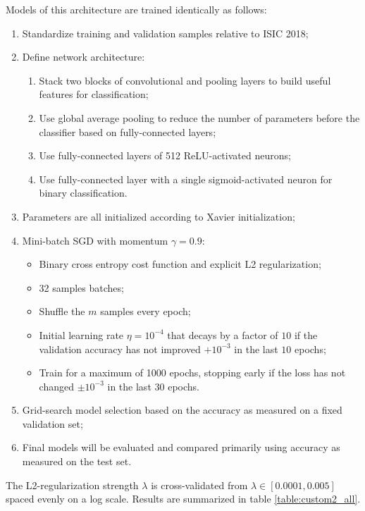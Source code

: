 Models of this architecture are trained identically as follows:

\begin{enumerate}
    \item Standardize training and validation samples relative to \ac{ISIC} 2018;
    \item Define network architecture:
        \begin{enumerate}
            \item Stack two blocks of convolutional and pooling layers to build useful features for classification;
            \item Use global average pooling to reduce the number of parameters before the classifier based on fully-connected layers;
            \item Use fully-connected layers of 512 ReLU-activated neurons;
            \item Use fully-connected layer with a single sigmoid-activated neuron for binary classification.
        \end{enumerate}
    \item Parameters are all initialized according to Xavier initialization;
    \item Mini-batch \ac{SGD} with momentum $\gamma = 0.9$:
        \begin{itemize}
            \item Binary cross entropy cost function and explicit L2 regularization;
            \item 32 samples batches;
            \item Shuffle the $m$ samples every epoch;
            \item Initial learning rate $\eta = 10^{-4}$ that decays by a factor of $10$ if the validation accuracy has not improved $+10^{-3}$ in the last $10$ epochs;
            \item Train for a maximum of 1000 epochs, stopping early if the loss has not changed $\pm 10^{-3}$ in the last $30$ epochs.
        \end{itemize}
    \item Grid-search model selection based on the accuracy as measured on a fixed validation set;
    \item Final models will be evaluated and compared primarily using accuracy as measured on the test set.
\end{enumerate}

The L2-regularization strength $\lambda$ is cross-validated from $\lambda \in [0.0001, 0.005]$ spaced evenly on a log scale. Results are summarized in table \ref{table:custom2_all}.

